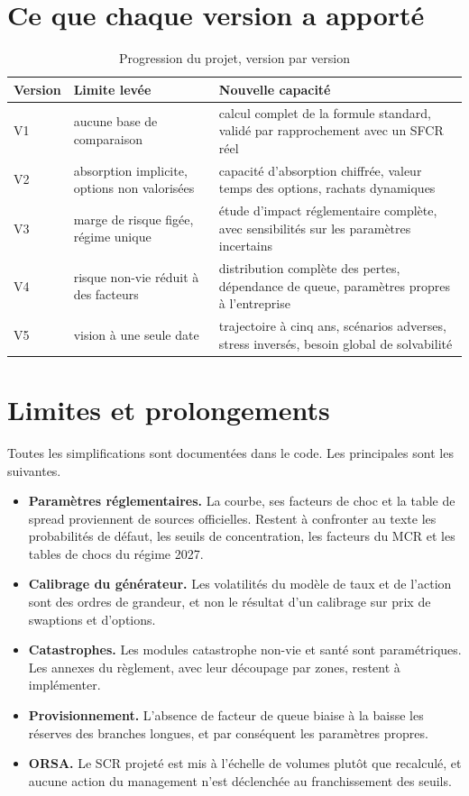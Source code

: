 \documentclass[11pt,a4paper]{article}
\begin{document}
\section{Ce que chaque version a apporté}

\begin{table}[H]\centering\small
\caption{Progression du projet, version par version}
\begin{tabularx}{\linewidth}{lXX}
\toprule
\textbf{Version} & \textbf{Limite levée} & \textbf{Nouvelle capacité}\\
\midrule
V1 & aucune base de comparaison & calcul complet de la formule standard, validé par rapprochement
avec un SFCR réel\\
V2 & absorption implicite, options non valorisées & capacité d'absorption chiffrée, valeur temps
des options, rachats dynamiques\\
V3 & marge de risque figée, régime unique & étude d'impact réglementaire complète, avec
sensibilités sur les paramètres incertains\\
V4 & risque non-vie réduit à des facteurs & distribution complète des pertes, dépendance de queue,
paramètres propres à l'entreprise\\
V5 & vision à une seule date & trajectoire à cinq ans, scénarios adverses, stress inversés, besoin
global de solvabilité\\
\bottomrule
\end{tabularx}
\end{table}

\section{Limites et prolongements}

Toutes les simplifications sont documentées dans le code. Les principales sont les suivantes.

\begin{itemize}
\item \textbf{Paramètres réglementaires.} La courbe, ses facteurs de choc et la table de spread
      proviennent de sources officielles. Restent à confronter au texte les probabilités de défaut,
      les seuils de concentration, les facteurs du MCR et les tables de chocs du régime 2027.
\item \textbf{Calibrage du générateur.} Les volatilités du modèle de taux et de l'action sont des
      ordres de grandeur, et non le résultat d'un calibrage sur prix de swaptions et d'options.
\item \textbf{Catastrophes.} Les modules catastrophe non-vie et santé sont paramétriques. Les
      annexes du règlement, avec leur découpage par zones, restent à implémenter.
\item \textbf{Provisionnement.} L'absence de facteur de queue biaise à la baisse les réserves des
      branches longues, et par conséquent les paramètres propres.
\item \textbf{ORSA.} Le SCR projeté est mis à l'échelle de volumes plutôt que recalculé, et aucune
      action du management n'est déclenchée au franchissement des seuils.
\end{itemize}
\end{document}
